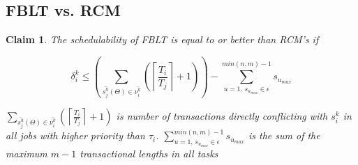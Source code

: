 \documentclass[conference]{IEEEtran}
\newtheorem{clm}{Claim}
\begin{document}
\subsection{FBLT vs. RCM}

\begin{clm}\label{clm:fblt_rcm}
The schedulability of FBLT is equal to or better than RCM's if 

\[
\delta_i^k\le\left(\sum_{\bar{s_{j}^{h}}(\Theta)\in\bar{\nu_{i}^{k}}}\left(\left\lceil \frac{T_{i}}{T_{j}}\right\rceil +1\right)\right)-\sum_{u=1,\,s_{u_{max}}\in \epsilon}^{min(n,m)-1} s_{u_{max}} \label{eq:fblt_rcm_comparison_16_clm}
\]

$\sum_{\bar{s_{j}^{h}}(\Theta)\in \bar{\nu_{i}^{k}}}\left(\left\lceil \frac{T_{i}}{T_{j}}\right\rceil +1\right)$ is number of transactions directly conflicting with $s_{i}^{k}$ in all jobs with higher priority than $\tau_{i}$. $\sum_{u=1,\,s_{u_{max}}\in \epsilon}^{min(n,m)-1} s_{u_{max}}$ is the sum of the maximum $m-1$ transactional lengths in all tasks
\end{clm}
%
\end{document}
